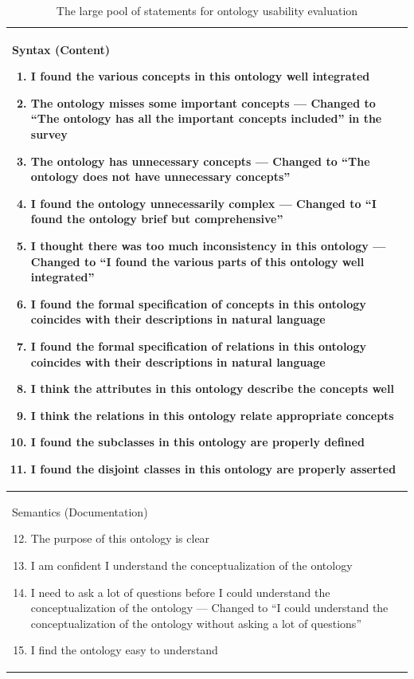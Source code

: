 \begin{longtable}{p{\textwidth}}
	\caption{The large pool of statements for ontology usability evaluation}
	\label{tab:statements-pool}\\
	\hline
	Syntax (Content)
	\begin{enumerate}
		\item I found the various concepts in this ontology well integrated
		\item The ontology misses some important concepts --- Changed to ``The ontology has all the important concepts included'' in the survey
		\item The ontology has unnecessary concepts --- Changed to ``The ontology does not have unnecessary concepts''
		\item I found the ontology unnecessarily complex --- Changed to ``I found the ontology brief but comprehensive''
		\item I thought there was too much inconsistency in this ontology --- Changed to ``I found the various parts of this ontology well integrated''
		\item I found the formal specification of concepts in this ontology coincides with their descriptions in natural language
		\item I found the formal specification of relations in this ontology coincides with their descriptions in natural language
		\item I think the attributes in this ontology describe the concepts well
		\item I think the relations in this ontology relate appropriate concepts
		\item I found the subclasses in this ontology are properly defined
		\item I found the disjoint classes in this ontology are properly asserted
	\end{enumerate} \\
	\hline
	Semantics (Documentation)
	\begin{enumerate}
		\setcounter{enumi}{11}
		\item The purpose of this ontology is clear
		\item I am confident I understand the conceptualization of the ontology
		\item I need to ask a lot of questions before I could understand the conceptualization of the ontology --- Changed to ``I could understand the conceptualization of the ontology without asking a lot of questions''
		\item I find the ontology easy to understand

\end{enumerate}
\end{longtable}
